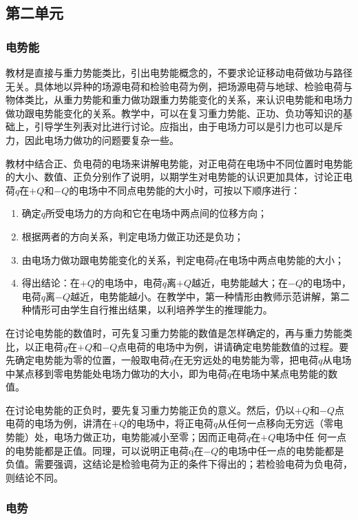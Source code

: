 \subsection{第二单元}
\subsubsection{电势能}

教材是直接与重力势能类比，引出电势能概念的，不要求论证移动电荷做功与路径无关。具体地以异种的场源电荷和检验电荷为例，把场源电荷与地球、检验电荷与物体类比，从重力势能和重力做功跟重力势能变化的关系，来认识电势能和电场力做功跟电势能变化的关系。教学中，可以在复习重力势能、正功、负功等知识的基础上，引导学生列表对比进行讨论。应指出，由于电场力可以是引力也可以是斥力，因此电场力做功的问题要复杂一些。

教材中结合正、负电荷的电场来讲解电势能，对正电荷在电场中不同位置时电势能的大小、数值、正负分别作了说明，以期学生对电势能的认识更加具体，讨论正电荷$q$在$+Q$和$-Q$的电场中不同点电势能的大小时，可按以下顺序进行：
\begin{enumerate}
\item 确定$q$所受电场力的方向和它在电场中两点间的位移方向；    \item 根据两者的方向关系，判定电场力做正功还是负功；    \item 由电场力做功跟电势能变化的关系，判定电荷$q$在电场中两点电势能的大小；    \item 得出结论：在$+Q$的电场中，电荷$q$离$+Q$越近，电势能越大；在$-Q$的电场中，电荷$q$离$-Q$越近，电势能越小。在教学中，第一种情形由教师示范讲解，第二种情形可由学生自行推出结果，以利培养学生的推理能力。
\end{enumerate}

在讨论电势能的数值时，可先复习重力势能的数值是怎样确定的，再与重力势能类比，以正电荷$q$在$+Q$和$-Q$点电荷的电场中为例，讲请确定电势能数值的过程。要先确定电势能为零的位置，一般取电荷$q$在无穷远处的电势能为零，把电荷$q$从电场中某点移到零电势能处电场力做功的大小，即为电荷$q$在电场中某点电势能的数值。

在讨论电势能的正负时，要先复习重力势能正负的意义。然后，仍以$+Q$和$-Q$点电荷的电场为例，讲清在$+Q$的电场中，将正电荷$q$从任何一点移向无穷远（零电势能）处，电场力做正功，电势能减小至零；因而正电荷$q$在$+Q$电场中任
何一点的电势能都是正值。同理，可以说明正电荷q在$-Q$的电场中任一点的电势能都是负值。需要强调，这结论是检验电荷为正的条件下得出的；若检验电荷为负电荷，则结论不同。

\subsubsection{电势}

